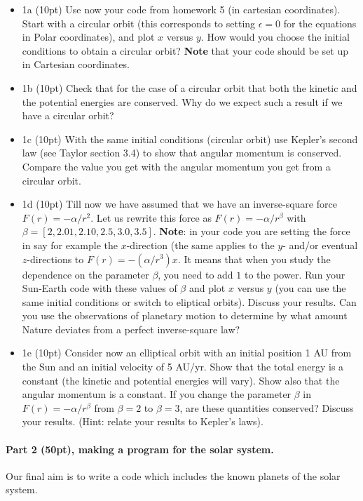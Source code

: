\documentclass[%
oneside,                 %
final,                   %
10pt]{article}
\begin{document}
\begin{itemize}
\item 1a (10pt) Use now your code from homework 5 (in cartesian coordinates). Start with a circular orbit (this corresponds to  setting $\epsilon=0$ for the equations in Polar coordinates), and plot $x$ versus $y$. How would you choose the initial conditions to obtain a circular orbit?  \textbf{Note} that your code should be set up  in Cartesian coordinates.

\item 1b (10pt) Check that for the case of a circular orbit that both the kinetic and the potential energies are conserved. Why do we expect such a result if we have a circular orbit? 

\item 1c (10pt) With the same initial conditions (circular orbit) use Kepler's second law (see Taylor section 3.4) to show that angular momentum is conserved. Compare the value you get with the angular momentum you get from a circular orbit. 

\item 1d (10pt) Till now we have assumed that we have an inverse-square force $F(r) = -\alpha/r^2$. Let us rewrite this force as $F(r) =-\alpha/r^{\beta}$ with $\beta=[2,2.01,2.10,2.5,3.0,3.5]$. \textbf{Note}: in your code you are setting the force in say for example the $x$-direction (the same applies to the $y$- and/or eventual $z$-directions to $F(r) = -(\alpha/r^3)x$. It means that when you study the dependence on the parameter $\beta$, you need to add $1$ to the power. Run your Sun-Earth code with these values of $\beta$ and plot $x$ versus $y$ (you can use the same initial conditions or switch to eliptical orbits). Discuss your results. Can you use the observations of planetary motion to determine by what amount Nature deviates from a perfect inverse-square law?

\item 1e (10pt) Consider now an elliptical orbit with an initial position 1 AU from the Sun and an initial  velocity of 5 AU/yr. Show that the total energy is a constant (the kinetic and potential energies will vary). Show also that the angular momentum is a constant. If you change the parameter $\beta$ in $F(r) = -\alpha/r^{\beta}$ from $\beta=2$ to $\beta=3$, are these quantities conserved?  Discuss your results. (Hint: relate your results to Kepler's laws). 
\end{itemize}

\noindent
\paragraph{Part 2 (50pt), making a program for the solar system.}
Our final aim is to write a code which includes the known planets of the solar system. 
\end{document}

